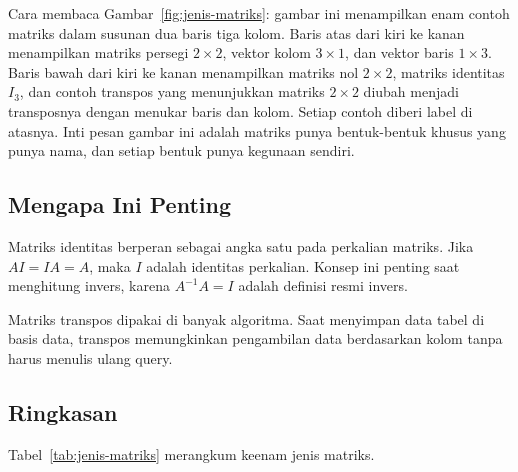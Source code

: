 \documentclass[11pt,a4paper]{article}
\begin{document}
Cara membaca Gambar~\ref{fig:jenis-matriks}: gambar ini menampilkan enam contoh matriks dalam susunan dua baris tiga kolom. Baris atas dari kiri ke kanan menampilkan matriks persegi $2 \times 2$, vektor kolom $3 \times 1$, dan vektor baris $1 \times 3$. Baris bawah dari kiri ke kanan menampilkan matriks nol $2 \times 2$, matriks identitas $I_3$, dan contoh transpos yang menunjukkan matriks $2 \times 2$ diubah menjadi transposnya dengan menukar baris dan kolom. Setiap contoh diberi label di atasnya. Inti pesan gambar ini adalah matriks punya bentuk-bentuk khusus yang punya nama, dan setiap bentuk punya kegunaan sendiri.

\subsection{Mengapa Ini Penting}

Matriks identitas berperan sebagai angka satu pada perkalian matriks. Jika $AI=IA=A$, maka $I$ adalah identitas perkalian. Konsep ini penting saat menghitung invers, karena $A^{-1}A=I$ adalah definisi resmi invers.

Matriks transpos dipakai di banyak algoritma. Saat menyimpan data tabel di basis data, transpos memungkinkan pengambilan data berdasarkan kolom tanpa harus menulis ulang query.

\subsection{Ringkasan}

Tabel~\ref{tab:jenis-matriks} merangkum keenam jenis matriks.
\end{document}

